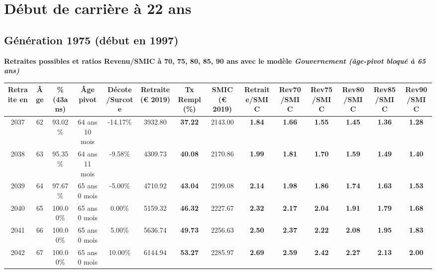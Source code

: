  \addto{\captionsenglish}{ \renewcommand{\mtctitle}{}} \setcounter{minitocdepth}{2} 
 \minitoc \newpage 

\section{Début de carrière à 22 ans} 

\subsection{Génération 1975 (début en 1997)} 

{\bf \noindent Retraites possibles et ratios Revenu/SMIC à 70, 75, 80, 85, 90 ans avec le modèle \emph{Gouvernement (âge-pivot bloqué à 65 ans)}}  
 
\begin{adjustbox}{max width=\textwidth} 
\begin{tabular}[htb]{|c|c||c|c|c||c|c||c||c|c|c|c|c|c|} 
\hline 
 Retraite en &  Âge &  \%(43ans) &  Âge pivot &  Décote/Surcote &  Retraite (\euro{} 2019) &  Tx Rempl(\%) &  SMIC (\euro{} 2019) &  Retraite/SMIC &  Rev70/SMIC &  Rev75/SMIC &  Rev80/SMIC &  Rev85/SMIC &  Rev90/SMIC \\ 
\hline \hline 
 2037 &  62 &  93.02\% &  64 ans 10 mois &  -14.17\% &  3932.80 &  {\bf 37.22} &  2143.00 &  {\bf 1.84} &  {\bf 1.66} &  {\bf 1.55} &  {\bf 1.45} &  {\bf 1.36} &  {\bf 1.28} \\ 
\hline 
 2038 &  63 &  95.35\% &  64 ans 11 mois &  -9.58\% &  4309.73 &  {\bf 40.08} &  2170.86 &  {\bf 1.99} &  {\bf 1.81} &  {\bf 1.70} &  {\bf 1.59} &  {\bf 1.49} &  {\bf 1.40} \\ 
\hline 
 2039 &  64 &  97.67\% &  65 ans 0 mois &  -5.00\% &  4710.92 &  {\bf 43.04} &  2199.08 &  {\bf 2.14} &  {\bf 1.98} &  {\bf 1.86} &  {\bf 1.74} &  {\bf 1.63} &  {\bf 1.53} \\ 
\hline 
 2040 &  65 &  100.00\% &  65 ans 0 mois &  0.00\% &  5159.32 &  {\bf 46.32} &  2227.67 &  {\bf 2.32} &  {\bf 2.17} &  {\bf 2.04} &  {\bf 1.91} &  {\bf 1.79} &  {\bf 1.68} \\ 
\hline 
 2041 &  66 &  100.00\% &  65 ans 0 mois &  5.00\% &  5636.74 &  {\bf 49.73} &  2256.63 &  {\bf 2.50} &  {\bf 2.37} &  {\bf 2.22} &  {\bf 2.08} &  {\bf 1.95} &  {\bf 1.83} \\ 
\hline 
 2042 &  67 &  100.00\% &  65 ans 0 mois &  10.00\% &  6144.94 &  {\bf 53.27} &  2285.97 &  {\bf 2.69} &  {\bf 2.59} &  {\bf 2.42} &  {\bf 2.27} &  {\bf 2.13} &  {\bf 2.00} \\ 
\hline 
\hline 
\end{tabular} 
\end{adjustbox} 
 
